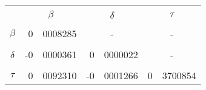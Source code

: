 		

		\begin{tabular}{cr@{.}lr@{.}lr@{.}l}
		& \multicolumn{2}{c}{ } & \multicolumn{2}{c}{ } & \multicolumn{2}{c}{ } \\
		& \multicolumn{2}{c}{{\bf{$\beta$}}} & \multicolumn{2}{c}{{\bf{$\delta$}}} & \multicolumn{2}{c}{{\bf{$\tau$}}} \\
		& \multicolumn{2}{c}{ } & \multicolumn{2}{c}{ } & \multicolumn{2}{c}{ } \\
		{\bf{$\beta$}} &			 0&0008285		&	\multicolumn{2}{c}{ - }		&  \multicolumn{2}{c}{ - }	\\
		& \multicolumn{2}{c}{ } & \multicolumn{2}{c}{ } & \multicolumn{2}{c}{ } \\
		 {\bf{$\delta$}} &			-0&0000361		&	0&0000022				& \multicolumn{2}{c}{ - } \\
		& \multicolumn{2}{c}{ } & \multicolumn{2}{c}{ } & \multicolumn{2}{c}{ } \\
		 {\bf{$\tau$}} &			0&0092310		&	-0&0001266				& 0&3700854 \\
		\end{tabular}
